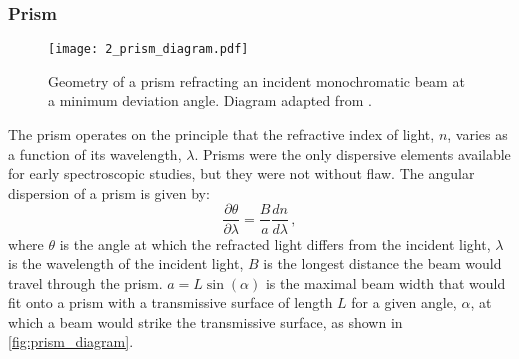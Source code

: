 \subsubsection{Prism} \label{subsubsec:prism}

\begin{figure}[t]
    \centering
    \texttt{[image: 2\_prism\_diagram.pdf]}
    \caption{Geometry of a prism refracting an incident monochromatic beam at a minimum deviation angle. Diagram adapted from \cite{BirneyObsAstro}.}
    \label{fig:prism_diagram}
\end{figure}

The prism operates on the principle that the refractive index of light, $n$, varies as a function of its wavelength, $\lambda$. Prisms were the only dispersive elements available for early spectroscopic studies, but they were not without flaw. The angular dispersion of a prism is given by:
\begin{equation} \label{eq:prism_angular_dispersion}
    \frac{\partial \theta}{\partial \lambda} = \frac{B}{a}\frac{dn}{d\lambda}\,,
\end{equation}
where $\theta$ is the angle at which the refracted light differs from the incident light, $\lambda$ is the wavelength of the incident light, $B$ is the longest distance the beam would travel through the prism. $a = L \sin(\alpha)$ is the maximal beam width that would fit onto a prism with a transmissive surface of length $L$ for a given angle, $\alpha$, at which a beam would strike the transmissive surface, as shown in \autoref{fig:prism_diagram}.

